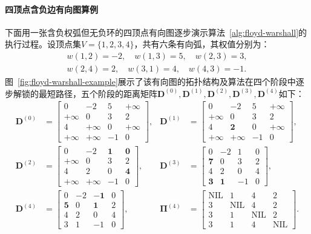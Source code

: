 \paragraph{四顶点含负边有向图算例}
下面用一张含负权弧但无负环的四顶点有向图逐步演示算法~\ref{alg:floyd-warshall}的执行过程。设顶点集$V=\{1,2,3,4\}$，共有六条有向弧，其权值分别为：
\[
  \begin{gathered}
    w(1,2)=-2,\quad w(1,3)=5,\quad w(2,3)=3,\\
    w(2,4)=2,\quad w(3,1)=4,\quad w(4,3)=-1.
  \end{gathered}
\]
图~\ref{fig:floyd-warshall-example}展示了该有向图的拓扑结构及算法在四个阶段中逐步解锁的最短路径，五个阶段的距离矩阵$\bm D^{(0)},\bm D^{(1)},\bm D^{(2)},\bm D^{(3)},\bm D^{(4)}$如下：
\[
  \begin{aligned}
    \bm D^{(0)} &= \begin{bmatrix}
      0 & -2 & 5 & +\infty \\
      +\infty & 0 & 3 & 2 \\
      4 & +\infty & 0 & +\infty \\
      +\infty & +\infty & -1 & 0
    \end{bmatrix}, &
    \bm D^{(1)} &= \begin{bmatrix}
      0 & -2 & 5 & +\infty \\
      +\infty & 0 & 3 & 2 \\
      4 & \mathbf{2} & 0 & +\infty \\
      +\infty & +\infty & -1 & 0
    \end{bmatrix}, \\[6pt]
    \bm D^{(2)} &= \begin{bmatrix}
      0 & -2 & \mathbf{1} & \mathbf{0} \\
      +\infty & 0 & 3 & 2 \\
      4 & 2 & 0 & \mathbf{4} \\
      +\infty & +\infty & -1 & 0
    \end{bmatrix}, &
    \bm D^{(3)} &= \begin{bmatrix}
      0 & -2 & 1 & 0 \\
      \mathbf{7} & 0 & 3 & 2 \\
      4 & 2 & 0 & 4 \\
      \mathbf{3} & \mathbf{1} & -1 & 0
    \end{bmatrix}, \\[6pt]
    \bm D^{(4)} &= \begin{bmatrix}
      0 & -2 & \mathbf{-1} & 0 \\
      \mathbf{5} & 0 & \mathbf{1} & 2 \\
      4 & 2 & 0 & 4 \\
      3 & 1 & -1 & 0
    \end{bmatrix}, &
    \bm\Pi^{(4)} &= \begin{bmatrix}
      \mathrm{NIL} & 1 & 4 & 2 \\
      3 & \mathrm{NIL} & 4 & 2 \\
      3 & 1 & \mathrm{NIL} & 2 \\
      3 & 1 & 4 & \mathrm{NIL}
    \end{bmatrix}.
  \end{aligned}
\]

